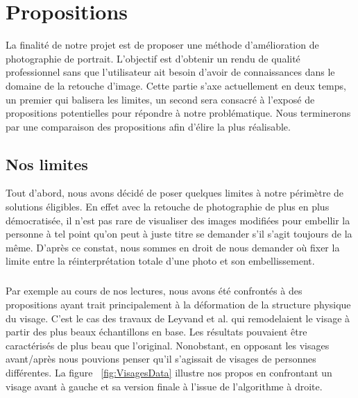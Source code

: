 \documentclass[11pt, french]{report-rd-info}
\begin{document}
\chapter{Propositions}
\label{chap:Propositions}
La finalité de notre projet est de proposer une méthode d'amélioration de photographie de portrait. L’objectif est d’obtenir un rendu de qualité professionnel sans que l’utilisateur ait besoin d’avoir de connaissances dans le domaine de la retouche d’image.
Cette partie s’axe actuellement en deux temps, un premier qui balisera les limites, un second sera consacré à l’exposé de propositions potentielles pour répondre à notre problématique. Nous terminerons par une comparaison des propositions afin d’élire la plus réalisable.
\section{Nos limites}
Tout d’abord, nous avons décidé de poser quelques limites à notre périmètre de solutions éligibles. En effet avec la retouche de photographie de plus en plus démocratisée, il n’est pas rare de visualiser des images modifiées pour embellir la personne à tel point qu’on peut à juste titre se demander s’il s’agit toujours de la même. D’après ce constat, nous sommes en droit de nous demander où fixer la limite entre la réinterprétation totale d’une photo et son embellissement.
\paragraph*{}
Par exemple au cours de nos lectures, nous avons été confrontés à des propositions ayant trait principalement à la déformation de la structure physique du visage. C'est le cas des travaux de Leyvand et al. \cite{Leyvand2008} qui remodelaient le visage à partir des plus beaux échantillons en base. Les résultats pouvaient être caractérisés de plus beau que l’original. Nonobstant, en opposant les visages avant/après nous pouvions penser qu’il s'agissait de visages de personnes différentes. La figure ~\ref{fig:VisagesData} illustre nos propos en confrontant un visage avant à gauche et sa version finale à l’issue de l’algorithme à droite.
\end{document}
